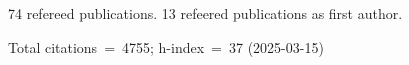 74 refereed publications. 13 refeered publications as first author.

Total citations~=~4755; h-index~=~37 (2025-03-15)